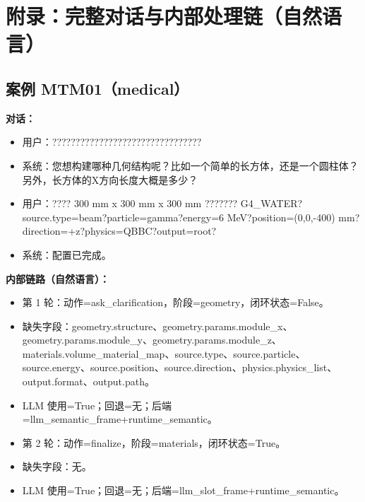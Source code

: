 \documentclass[11pt]{ctexart}
\begin{document}
\section{附录：完整对话与内部处理链（自然语言）}
\subsection{案例 MTM01（medical）}
\textbf{对话：}
\begin{itemize}
\item 用户：????????????????????????????????
\item 系统：您想构建哪种几何结构呢？比如一个简单的长方体，还是一个圆柱体？另外，长方体的X方向长度大概是多少？
\item 用户：???? 300 mm x 300 mm x 300 mm ??????? G4\_WATER?source.type=beam?particle=gamma?energy=6 MeV?position=(0,0,-400) mm?direction=+z?physics=QBBC?output=root?
\item 系统：配置已完成。
\end{itemize}
\textbf{内部链路（自然语言）：}
\begin{itemize}
\item 第 1 轮：动作=ask\_clarification，阶段=geometry，闭环状态=False。
\item 缺失字段：geometry.structure、geometry.params.module\_x、geometry.params.module\_y、geometry.params.module\_z、materials.volume\_material\_map、source.type、source.particle、source.energy、source.position、source.direction、physics.physics\_list、output.format、output.path。
\item LLM 使用=True；回退=无；后端=llm\_semantic\_frame+runtime\_semantic。
\item 第 2 轮：动作=finalize，阶段=materials，闭环状态=True。
\item 缺失字段：无。
\item LLM 使用=True；回退=无；后端=llm\_slot\_frame+runtime\_semantic。
\end{itemize}
\end{document}
